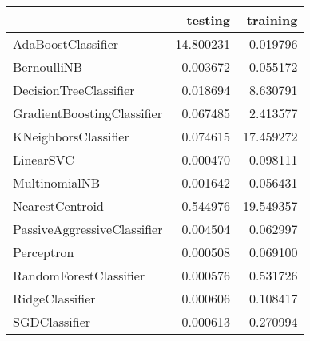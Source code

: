 \begin{tabular}{lrr}
\toprule
{} &    testing &   training \\
\midrule
AdaBoostClassifier          &  14.800231 &   0.019796 \\
BernoulliNB                 &   0.003672 &   0.055172 \\
DecisionTreeClassifier      &   0.018694 &   8.630791 \\
GradientBoostingClassifier  &   0.067485 &   2.413577 \\
KNeighborsClassifier        &   0.074615 &  17.459272 \\
LinearSVC                   &   0.000470 &   0.098111 \\
MultinomialNB               &   0.001642 &   0.056431 \\
NearestCentroid             &   0.544976 &  19.549357 \\
PassiveAggressiveClassifier &   0.004504 &   0.062997 \\
Perceptron                  &   0.000508 &   0.069100 \\
RandomForestClassifier      &   0.000576 &   0.531726 \\
RidgeClassifier             &   0.000606 &   0.108417 \\
SGDClassifier               &   0.000613 &   0.270994 \\
\bottomrule
\end{tabular}
